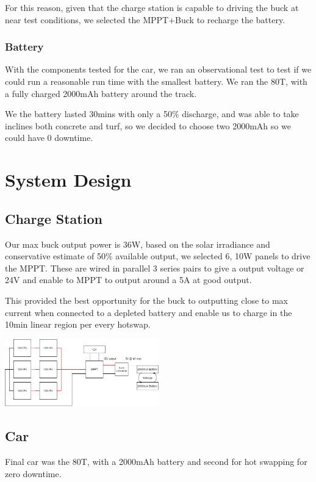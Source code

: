 \documentclass[11pt]{article}
\begin{document}
For this reason, given that the charge station is capable to driving the buck at near test conditions, we selected the MPPT+Buck to recharge the battery.

\subsubsection*{Battery}
With the components tested for the car, we ran an observational test to test if we could run a reasonable run time with the smallest battery. We ran the 80T, with a fully charged 2000mAh battery around the track. 

We the battery lasted 30mins with only a 50\% discharge, and was able to take inclines both concrete and turf, so we decided to choose two 2000mAh so we could have 0 downtime.  

\newpage
\section{System Design}
\subsection{Charge Station}

Our max buck output power is 36W, based on the solar irradiance and conservative estimate of 50\% available output, we selected 6, 10W panels to drive the MPPT. These are wired in parallel 3 series pairs to give a output voltage or 24V and enable to MPPT to output around a 5A at good output.

This provided the best opportunity for the buck to outputting close to max current when connected to a depleted battery and enable us to charge in the 10min linear region per every hotswap.

\begin{center}
    \includegraphics[width=0.5\textwidth]{inc/panels.png}
\end{center}

\subsection{Car}

Final car was the 80T, with a 2000mAh battery and second for hot swapping for zero downtime.
\end{document}
